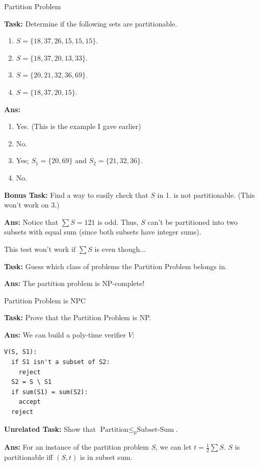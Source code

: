 \documentclass{beamer}
\begin{document}
\begin{frame}{Partition Problem}

\textbf{Task:} Determine if the following sets are partitionable.

\begin{enumerate}
    \item $S = \{18, 37, 26, 15, 15, 15\}$.
    \item $S = \{18, 37, 20, 13, 33\}$.
    \item $S = \{20, 21, 32, 36, 69\}$.
    \item $S = \{18, 37, 20, 15\}$.
\end{enumerate}

\textbf{Ans:}
\begin{enumerate}
    \item Yes. (This is the example I gave earlier)
    \item No. \pause
    \item Yes; $S_1 = \{20, 69\}$ and $S_2 = \{21, 32, 36\}$. \pause
    \item No. \pause
\end{enumerate}

\pause 

\textbf{Bonus Task:} Find a way to easily check that $S$ in 1. is not partitionable. (This won't work on 3.)

\pause

\textbf{Ans:} Notice that $\sum S = 121$ is odd. Thus, $S$ can't be partitioned into two subsets with equal sum (since both subsets have integer sums). 

\pause

This test won't work if $\sum S$ is even though... \pause

\vspace{2mm}

\textbf{Task:} Guess which class of problems the Partition Problem belongs in.\\

\pause

\textbf{Ans:} The partition problem is NP-complete!

\end{frame}

\begin{frame}[fragile]{Partition Problem is NPC}

\textbf{Task:} Prove that the Partition Problem is NP.\\

\pause

\textbf{Ans:} We can build a poly-time verifier $V$:
\begin{verbatim}
V(S, S1):
  if S1 isn't a subset of S2:
    reject
  S2 = S \ S1
  if sum(S1) = sum(S2):
    accept
  reject
\end{verbatim}

\pause

\textbf{Unrelated Task:} Show that $\text{Partition} \leq_p \text{Subset-Sum}$.

\pause

\textbf{Ans:} For an instance of the partition problem $S$, we can let $t = \frac{1}{2} \sum S$. $S$ is partitionable iff $(S, t)$ is in subset sum.
\end{frame}
\end{document}
